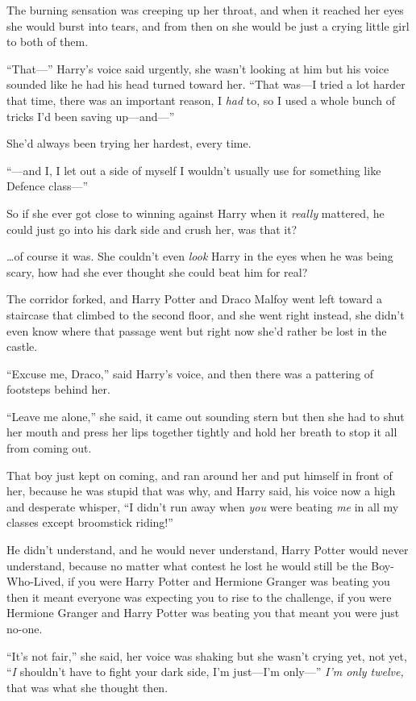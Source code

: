 The burning sensation was creeping up her throat, and when it reached her eyes she would burst into tears, and from then on she would be just a crying little girl to both of them.

“That—” Harry’s voice said urgently, she wasn’t looking at him but his voice sounded like he had his head turned toward her.
“That was—I tried a lot harder that time, there was an important reason, I \emph{had} to, so I used a whole bunch of tricks I’d been saving up—and—”

She’d always been trying her hardest, every time.

“—and I, I let out a side of myself I wouldn’t usually use for something like Defence class—”

So if she ever got close to winning against Harry when it \emph{really} mattered, he could just go into his dark side and crush her, was that it?

…of course it was. She couldn’t even \emph{look} Harry in the eyes when he was being scary, how had she ever thought she could beat him for real?

The corridor forked, and Harry Potter and Draco Malfoy went left toward a staircase that climbed to the second floor, and she went right instead, she didn’t even know where that passage went but right now she’d rather be lost in the castle.

“Excuse me, Draco,” said Harry’s voice, and then there was a pattering of footsteps behind her.

“Leave me alone,” she said, it came out sounding stern but then she had to shut her mouth and press her lips together tightly and hold her breath to stop it all from coming out.

That boy just kept on coming, and ran around her and put himself in front of her, because he was stupid that was why, and Harry said, his voice now a high and desperate whisper,
“I didn’t run away when \emph{you} were beating \emph{me} in all my classes except broomstick riding!”

He didn’t understand, and he would never understand, Harry Potter would never understand, because no matter what contest he lost he would still be the Boy-Who-Lived, if you were Harry Potter and Hermione Granger was beating you then it meant everyone was expecting you to rise to the challenge, if you were Hermione Granger and Harry Potter was beating you that meant you were just no-one.

“It’s not fair,” she said, her voice was shaking but she wasn’t crying yet, not yet, “\emph{I} shouldn’t have to fight your dark side, I’m just—I’m only—” \emph{I’m only twelve,} that was what she thought then.

